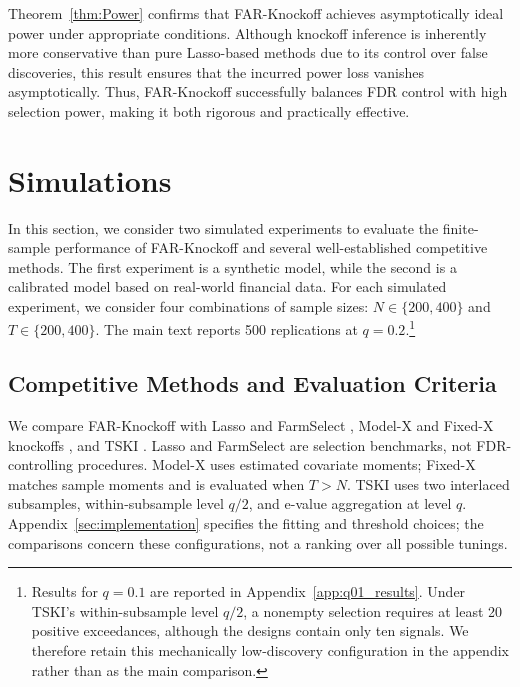 ﻿\documentclass[12pt]{article}
\newcommand{\0}{\mbox{\bf 0}}
\theoremstyle{plain}%
\theoremstyle{definition}
\begin{document}
{Theorem~\ref{thm:Power} confirms that FAR-Knockoff achieves asymptotically ideal power under appropriate conditions. Although knockoff inference is inherently more conservative than pure Lasso-based methods \citep[e.g.][]{FanKeWang2020} due to its control over false discoveries, this result ensures that the incurred power loss vanishes asymptotically. Thus, FAR-Knockoff successfully balances FDR control with high selection power, making it both rigorous and practically effective.


\fi




\section{Simulations}
\label{sec:sim}


{\color{minorrevisionred}
In this section, we consider two simulated experiments to evaluate the finite-sample performance of FAR-Knockoff and several well-established competitive methods. The first experiment is a synthetic model, while the second is a calibrated model based on real-world financial data. For each simulated experiment, we consider four combinations of sample sizes: $N \in \{200, 400\}$ and $T \in \{200, 400\}$. The main text reports 500 replications at $q=0.2$.\footnote{Results for $q=0.1$ are reported in Appendix~\ref{app:q01_results}. Under TSKI's within-subsample level $q/2$, a nonempty selection requires at least 20 positive exceedances, although the designs contain only ten signals. We therefore retain this mechanically low-discovery configuration in the appendix rather than as the main comparison.}
}


\subsection{Competitive Methods and Evaluation Criteria}

We compare FAR-Knockoff with Lasso and {\sc FarmSelect} \citep{FanKeWang2020}, Model-X and Fixed-X knockoffs \citep{CandesFanEtal2018}, and TSKI \citep{ChiFanIngLv2025}. Lasso and FarmSelect are selection benchmarks, not FDR-controlling procedures. Model-X uses estimated covariate moments; Fixed-X matches sample moments and is evaluated when $T>N$. TSKI uses two interlaced subsamples, within-subsample level $q/2$, and e-value aggregation at level $q$. Appendix~\ref{sec:implementation} specifies the fitting and threshold choices; the comparisons concern these configurations, not a ranking over all possible tunings.

}
\end{document}
